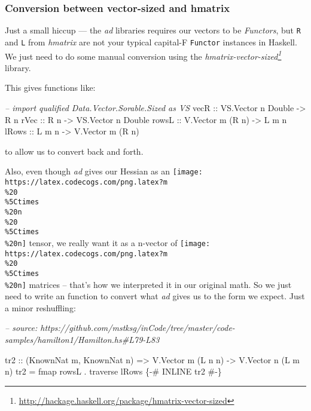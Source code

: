 \documentclass[]{article}
\newenvironment{Shaded}{}{}
\newcommand{\CommentTok}[1]{\textcolor[rgb]{0.38,0.63,0.69}{\textit{#1}}}
\newcommand{\DataTypeTok}[1]{\textcolor[rgb]{0.56,0.13,0.00}{#1}}
\newcommand{\FunctionTok}[1]{\textcolor[rgb]{0.02,0.16,0.49}{#1}}
\newcommand{\NormalTok}[1]{#1}
\newcommand{\OtherTok}[1]{\textcolor[rgb]{0.00,0.44,0.13}{#1}}
\renewcommand{\href}[2]{#2\footnote{\url{#1}}}
\begin{document}
\hypertarget{conversion-between-vector-sized-and-hmatrix}{%
\subsubsection{Conversion between vector-sized and
hmatrix}\label{conversion-between-vector-sized-and-hmatrix}}

Just a small hiccup --- the \emph{ad} libraries requires our vectors to be
\emph{Functors}, but \texttt{R} and \texttt{L} from \emph{hmatrix} are not your
typical capital-F \texttt{Functor} instances in Haskell. We just need to do some
manual conversion using the
\emph{\href{http://hackage.haskell.org/package/hmatrix-vector-sized}{hmatrix-vector-sized}}
library.

This gives functions like:

\begin{Shaded}
\begin{Highlighting}[]
\CommentTok{-- import qualified Data.Vector.Sorable.Sized as VS}
\OtherTok{vecR  ::} \DataTypeTok{VS.Vector}\NormalTok{ n }\DataTypeTok{Double} \OtherTok{->} \DataTypeTok{R}\NormalTok{ n}
\OtherTok{rVec  ::} \DataTypeTok{R}\NormalTok{ n                }\OtherTok{->} \DataTypeTok{VS.Vector}\NormalTok{ n }\DataTypeTok{Double}
\OtherTok{rowsL ::} \DataTypeTok{V.Vector}\NormalTok{ m (}\DataTypeTok{R}\NormalTok{ n)   }\OtherTok{->} \DataTypeTok{L}\NormalTok{ m n}
\OtherTok{lRows ::} \DataTypeTok{L}\NormalTok{ m n              }\OtherTok{->} \DataTypeTok{V.Vector}\NormalTok{ m (}\DataTypeTok{R}\NormalTok{ n)}
\end{Highlighting}
\end{Shaded}

to allow us to convert back and forth.

Also, even though \emph{ad} gives our Hessian as an
\texttt{[image: https://latex.codecogs.com/png.latex?m\\\%20\\\%5Ctimes\\\%20n\\\%20\\\%5Ctimes\\\%20n]}
tensor, we really want it as a n-vector of
\texttt{[image: https://latex.codecogs.com/png.latex?m\\\%20\\\%5Ctimes\\\%20n]}
matrices -- that's how we interpreted it in our original math. So we just need
to write an function to convert what \emph{ad} gives us to the form we expect.
Just a minor reshuffling:

\begin{Shaded}
\begin{Highlighting}[]
\CommentTok{-- source: https://github.com/mstksg/inCode/tree/master/code-samples/hamilton1/Hamilton.hs#L79-L83}

\OtherTok{tr2 ::}\NormalTok{ (}\DataTypeTok{KnownNat}\NormalTok{ m, }\DataTypeTok{KnownNat}\NormalTok{ n)}
    \OtherTok{=>} \DataTypeTok{V.Vector}\NormalTok{ m (}\DataTypeTok{L}\NormalTok{ n n)}
    \OtherTok{->} \DataTypeTok{V.Vector}\NormalTok{ n (}\DataTypeTok{L}\NormalTok{ m n)}
\NormalTok{tr2 }\FunctionTok{=}\NormalTok{ fmap rowsL }\FunctionTok{.}\NormalTok{ traverse lRows}
\OtherTok{\{-# INLINE tr2 #-\}}
\end{Highlighting}
\end{Shaded}
\end{document}
